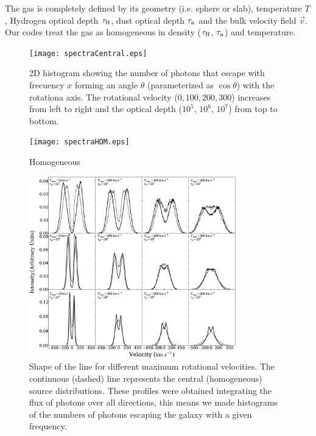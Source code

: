 \documentclass{emulateapj}
\newcommand{\ly}{{\ifmmode{{\rm Ly}\alpha~}\else{Ly$\alpha$~}\fi}}
\newcommand{\kms}{{\ifmmode{{\mathrm{\,km\ s}^{-1}}}\else{\,km~s$^{-1}$}\fi}}
\begin{document}
The gas is completely defined by its geometry (i.e. sphere or slab),
temperature $T$, Hydrogen optical depth $\tau_{\rm H}$, dust optical
depth $\tau_{\rm a}$ and the bulk velocity field $\vec{v}$. Our codes
treat the gas as homogeneous in density ($\tau_{\rm H}$, $\tau_{\rm
  a}$) and temperature.  

\begin{figure}
\begin{center}
  \texttt{[image: spectraCentral.eps]}
\end{center}
\caption{
2D histogram showing the number of photons that escape with frecuency
$x$ forming an angle $\theta$ (parameterized as $\cos\theta$) with the
rotationa axis. The rotational velocity ($0,100,200,300$\kms)
increases from left to right and the optical depth ($10^5$, $10^6$,
$10^7$) from top to bottom. 
\label{fig:CentralSpec} }   
\end{figure}

\begin{figure}
\begin{center}
  \texttt{[image: spectraHOM.eps]}
\end{center}
\caption{Homogeneous
    \label{fig:HOMSpec}}  
\end{figure}

\begin{figure}
\begin{center}
  \includegraphics[width=0.8\textwidth]{f1.eps}
\end{center}
\caption{Shape of the \ly line for
    different maximum rotational velocities. The continuous (dashed)
    line represents the central (homogeneous) source distributions. 
    These profiles were obtained integrating the flux of photons 
	over all directions, this means we made histograms of the 
	numbers of photons escaping the galaxy with a given frequency.
    \label{fig:differentvelocities}}  
\end{figure}
\end{document}
